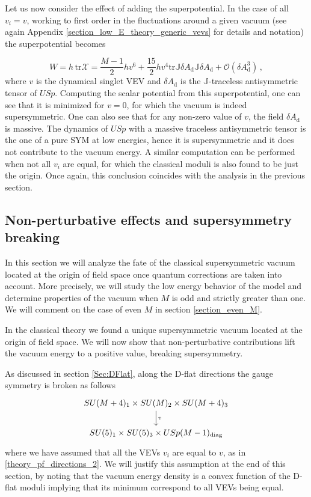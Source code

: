 \documentclass[a4paper,12pt]{article}
\begin{document}
Let us now consider the effect of adding the superpotential. In the case of all $v_i=v$, working to first order in the fluctuations around a given vacuum (see again Appendix \ref{section_low_E_theory_generic_vevs} for details and notation) the superpotential becomes
{\begin{equation}
W = h \, \mathrm{tr} \mathcal{X} = \frac{M-1}{2}h v^6 +\frac{15}{2}h v^4 \mathrm{tr}\mathbb{J}\delta A_\text{d}\mathbb{J}\delta A_\text{d} + \mathcal{O}(\delta A_\text{d}^3)\, ,
\label{perturbative_superpotential_pseudoflat_directions}
\end{equation}
where $v$ is the dynamical singlet VEV and $\delta A_\text{d}$ is the $\mathbb{J}$-traceless antisymmetric tensor of $USp$. Computing the scalar potential from this superpotential, one can see that it is minimized for $v=0$, for which the vacuum is indeed supersymmetric. One can also see that for any non-zero value of $v$, the field $\delta A_\text{d}$ is massive. The dynamics of $USp$ with a massive traceless antisymmetric tensor is the one of a pure SYM at low energies, hence it is supersymmetric and it does not contribute to the vacuum energy. A similar computation can be performed when not all $v_i$ are equal, for which the classical moduli is also found to be just the origin. Once again, this conclusion coincides with the analysis in the previous section.

\subsection{Non-perturbative effects and supersymmetry breaking} 
\label{np_eff1}

In this section we will analyze the fate of the classical supersymmetric vacuum located at the origin of field space once quantum corrections are taken into account. More precisely, we will study the low energy behavior of the model and determine properties of the vacuum when $M$ is odd and strictly greater than one. We will comment on the case of even $M$ in section \ref{section_even_M}.

In the classical theory we found a unique supersymmetric vacuum located at the origin of field space. We will now show that non-perturbative contributions lift the vacuum energy to a positive value, breaking supersymmetry.

As discussed in section \ref{Sec:DFlat}, along the D-flat directions the gauge symmetry is broken as follows
\[
\begin{tikzcd}
	SU(M+4)_1\times SU(M)_2 \times SU(M+4)_3 \arrow[d, "v"] \\
	 SU(5)_1 \times SU(5)_3 \times USp(M-1)_\text{diag}
\end{tikzcd}
\]
where we have assumed that all the VEVs $v_i $ are equal to $v$, as in \eqref{theory_pf_directions_2}. We will justify this assumption at the end of this section, by noting that the vacuum energy density is a convex function of the D-flat moduli implying that its minimum correspond to all VEVs being equal. 

}
\end{document}
